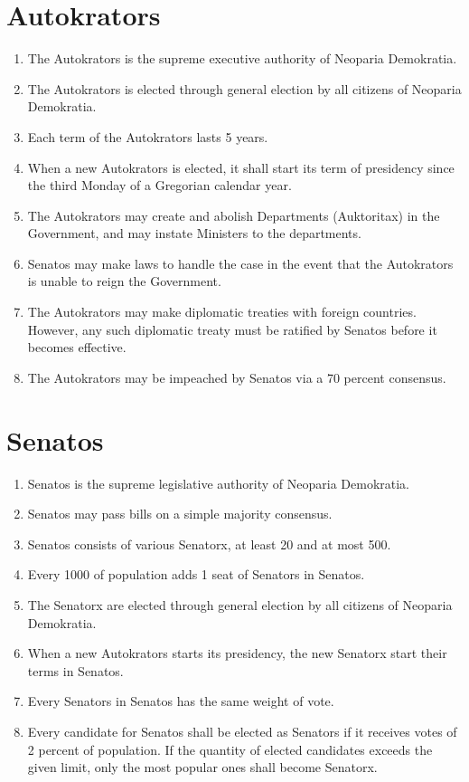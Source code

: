 \section{Autokrators}
\begin{enumerate}[start=201]
    \item The Autokrators is the supreme executive authority of Neoparia Demokratia.
	\item The Autokrators is elected through general election by all citizens of Neoparia Demokratia.
	\item Each term of the Autokrators lasts 5 years.
	\item When a new Autokrators is elected, it shall start its term of presidency since the third Monday of a Gregorian calendar year.
	\item The Autokrators may create and abolish Departments (Auktoritax) in the Government, and may instate Ministers to the departments.
	\item Senatos may make laws to handle the case in the event that the Autokrators is unable to reign the Government.
	\item The Autokrators may make diplomatic treaties with foreign countries.
	      However, any such diplomatic treaty must be ratified by Senatos before it becomes effective.
	\item The Autokrators may be impeached by Senatos via a 70 percent consensus.
\end{enumerate}





\section{Senatos}
\begin{enumerate}[start=301]
	\item Senatos is the supreme legislative authority of Neoparia Demokratia.
	\item Senatos may pass bills on a simple majority consensus.
	\item Senatos consists of various Senatorx, at least 20 and at most 500.
	\item Every 1000 of population adds 1 seat of Senators in Senatos.
	\item The Senatorx are elected through general election by all citizens of Neoparia Demokratia.
	\item When a new Autokrators starts its presidency, the new Senatorx start their terms in Senatos.
	\item Every Senators in Senatos has the same weight of vote.
	\item Every candidate for Senatos shall be elected as Senators if it receives votes of 2 percent of population.
	      If the quantity of elected candidates exceeds the given limit, only the most popular ones shall become Senatorx.
\end{enumerate}




